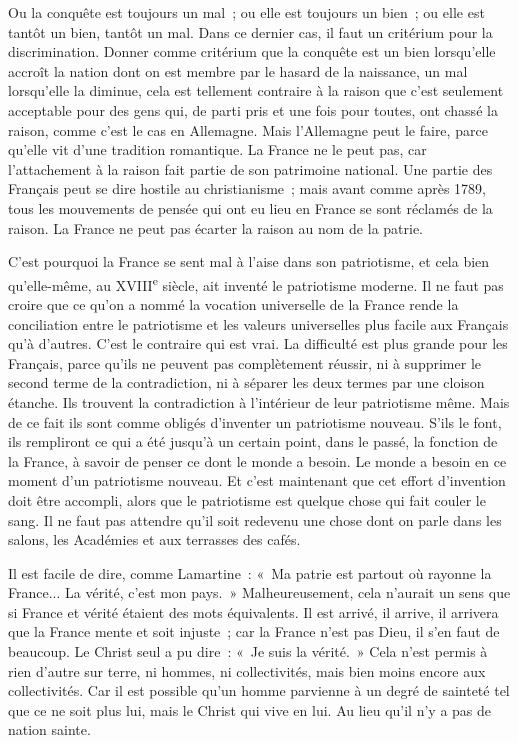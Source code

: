 \documentclass[french,twoside]{book} %
\begin{document}
Ou la conquête est toujours un mal ; ou elle est toujours un bien ; ou elle est tantôt un bien, tantôt un mal. Dans ce dernier cas, il faut un critérium pour la discrimination. Donner comme critérium que la conquête est un bien lorsqu'elle accroît la nation dont on est membre par le hasard de la naissance, un mal lorsqu'elle la diminue, cela est tellement contraire à la raison que c'est seulement acceptable pour des gens qui, de parti pris et une fois pour toutes, ont chassé la raison, comme c'est le cas en Allemagne. Mais l'Allemagne peut le faire, parce qu'elle vit d'une tradition romantique. La France ne le peut pas, car l'attachement à la raison fait partie de son patrimoine national. Une partie des Français peut se dire hostile au christianisme ; mais avant comme après 1789, tous les mouvements de pensée qui ont eu lieu en France se sont réclamés de la raison. La France ne peut pas écarter la raison au nom de la patrie.\par
C'est pourquoi la France se sent mal à l'aise dans son patriotisme, et cela bien qu'elle-même, au XVIII\textsuperscript{e} siècle, ait inventé le patriotisme moderne. Il ne faut pas croire que ce qu'on a nommé la vocation universelle de la France rende la conciliation entre le patriotisme et les valeurs universelles plus facile aux Français qu'à d'autres. C'est le contraire qui est vrai. La difficulté est plus grande pour les Français, parce qu'ils ne peuvent pas complètement réussir, ni à supprimer le second terme de la contradiction, ni à séparer les deux termes par une cloison étanche. Ils trouvent la contradiction à l'intérieur de leur patriotisme même. Mais de ce fait ils sont comme obligés d'inventer un patriotisme nouveau. S'ils le font, ils rempliront ce qui a été jusqu'à un certain point, dans le passé, la fonction de la France, à savoir de penser ce dont le monde a besoin. Le monde a besoin en ce moment d'un patriotisme nouveau. Et c'est maintenant que cet effort d'invention doit être accompli, alors que le patriotisme est quelque chose qui fait couler le sang. Il ne faut pas attendre qu'il soit redevenu une chose dont on parle dans les salons, les Académies et aux terrasses des cafés.\par
Il est facile de dire, comme Lamartine : « Ma patrie est partout où rayonne la France... La vérité, c'est mon pays. » Malheureusement, cela n'aurait un sens que si France et vérité étaient des mots équivalents. Il est arrivé, il arrive, il arrivera que la France mente et soit injuste ; car la France n'est pas Dieu, il s'en faut de beaucoup. Le Christ seul a pu dire : « Je suis la vérité. » Cela n'est permis à rien d'autre sur terre, ni hommes, ni collectivités, mais bien moins encore aux collectivités. Car il est possible qu'un homme parvienne à un degré de sainteté tel que ce ne soit plus lui, mais le Christ qui vive en lui. Au lieu qu'il n'y a pas de nation sainte.\par
\end{document}
